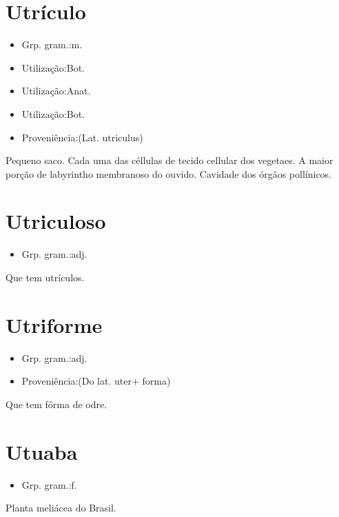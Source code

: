 \documentclass{article}
\begin{document}
\section{Utrículo}
\begin{itemize}
\item {Grp. gram.:m.}
\end{itemize}
\begin{itemize}
\item {Utilização:Bot.}
\end{itemize}
\begin{itemize}
\item {Utilização:Anat.}
\end{itemize}
\begin{itemize}
\item {Utilização:Bot.}
\end{itemize}
\begin{itemize}
\item {Proveniência:(Lat. \textunderscore utriculus\textunderscore )}
\end{itemize}
Pequeno saco.
Cada uma das céllulas de tecido cellular dos vegetaes.
A maior porção de labyrintho membranoso do ouvido.
Cavidade dos órgãos pollínicos.
\section{Utriculoso}
\begin{itemize}
\item {Grp. gram.:adj.}
\end{itemize}
Que tem utrículos.
\section{Utriforme}
\begin{itemize}
\item {Grp. gram.:adj.}
\end{itemize}
\begin{itemize}
\item {Proveniência:(Do lat. \textunderscore uter\textunderscore  + \textunderscore forma\textunderscore )}
\end{itemize}
Que tem fórma de odre.
\section{Utuaba}
\begin{itemize}
\item {Grp. gram.:f.}
\end{itemize}
Planta meliácea do Brasil.
\end{document}

